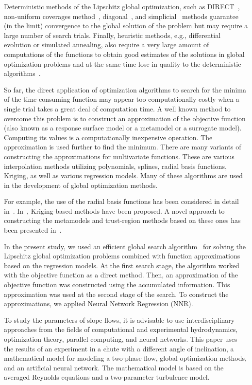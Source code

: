 \documentclass[mathematics,article,accept,pdftex,moreauthors]{Definitions/mdpi}
\begin{document}
Deterministic methods of the Lipschitz global optimization, such as DIRECT~\cite{Jones2009}, non-uniform coverages method~\cite{Evtushenko2009, Evtushenko2013}, diagonal~\cite{Sergeyev2017}, and simplicial~\cite{Zilinskas2014} methods guarantee (in the limit) convergence to the global solution of the problem but may require a large number of search trials.
Finally, heuristic methods, e.g., differential evolution or simulated annealing, also require a very large amount of computations of the functions to obtain good estimates of the solutions in global optimization problems and at the same time lose in quality to the deterministic algorithms~\cite{Sergeyev2018,Kvasov2018}.

So far, the direct application of optimization algorithms to search for the minima of the time-consuming function may appear too computationally costly when a single trial takes a great deal of computation time. 
A well known method to overcome this problem is to construct an approximation of the objective function (also known as a response surface model or a metamodel or a surrogate model). Computing its values is a computationally inexpensive operation. The approximation is used further to find the minimum.
There are many variants of constructing the approximations for multivariate functions. These are various interpolation methods utilizing polynomials, splines, radial basis functions, Kriging, as well as various regression models. Many of these algorithms are used in the development of global optimization methods.

For example, the use of the radial basis functions has been considered in detail in~\cite{Gutmann2001,Regis2005}. In~\cite{Jones1998,UrRehman2014,Ollar2017_1}, Kriging-based methods have been proposed. A novel approach to constructing the metamodels and trust-region methods based on these ones has been presented in~\cite{Polynkin2012,Ollar2017_2,Toropov2018}. 

In the present study, we used an efficient global search algorithm~\cite{Strongin2000,Sergeyev2013} for solving the Lipschitz global optimization problems combined with function approximations based on the regression models. At the first search stage, the algorithm worked with the objective function as a direct method. Then, an approximation of the objective function was constructed using the accumulated information. This approximation was used at the second stage of the search.
To construct the approximations, we applied Neural Network Regression (NNR).

To study the parameters of slope flows, it is advisable to use interdisciplinary approaches from the fields of computational and experimental hydrodynamics, optimization theory, parallel computing, and neural networks. This paper uses the results of an experiment in a chute with a different angle of inclination, a mathematical model for modeling a two-phase flow, global optimization methods, and an artificial neural network. The mathematical model is based on the averaged Reynolds equations and a two-parameter turbulence model. 
\end{document}
